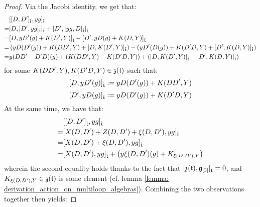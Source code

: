 \begin{proof}
                Via the Jacobi identity, we get that:
                    $$
                        \begin{aligned}
                            & [ [D, D']_{\hat{\mathfrak{t}}}, y g ]_{\hat{\mathfrak{t}}}
                            \\
                            = & [ D, [ D', y g ]_{\hat{\mathfrak{t}}} ]_{\hat{\mathfrak{t}}} + [ D', [ y g, D ]_{\hat{\mathfrak{t}}} ]_{\hat{\mathfrak{t}}}
                            \\
                            = & [ D, y D'( g ) + K(D', Y) ]_{\hat{\mathfrak{t}}} - [ D', y D( g ) + K(D, Y) ]_{\hat{\mathfrak{t}}}
                            \\
                            = & \left( y D( D'(g) ) + K(DD', Y) + [ D, K(D', Y) ]_{\hat{\mathfrak{t}}} \right) - \left( y D'( D(g) ) + K(D'D, Y) + [ D', K(D, Y) ]_{\hat{\mathfrak{t}}} \right)
                            \\
                            = & y (DD' - D'D)( g ) + ( K(DD', Y) - K(D'D, Y) ) + ( [ D, K(D', Y) ]_{\hat{\mathfrak{t}}} - [ D', K(D, Y) ]_{\hat{\mathfrak{t}}} )
                        \end{aligned}
                    $$
                for some $K(DD', Y), K(D'D, Y) \in \mathfrak{z}(\mathfrak{t})$ such that:
                    $$[ D, y D'( g ) ]_{\hat{\mathfrak{t}}} := y D( D'( g ) ) + K(DD', Y)$$
                    $$[ D', y D( g ) ]_{\hat{\mathfrak{t}}} := y D( D'( g ) ) + K(D'D, Y)$$
                At the same time, we have that:
                    $$
                        \begin{aligned}
                            & [ [D, D']_{\hat{\mathfrak{t}}}, y g ]_{\hat{\mathfrak{t}}}
                            \\
                            = & [ X(D, D') + Z(D, D') + \xi(D, D') , y g ]_{\hat{\mathfrak{t}}}
                            \\
                            = & [ X(D, D') + \xi(D, D') , y g ]_{\hat{\mathfrak{t}}}
                            \\
                            = & [ X(D, D') , y g ]_{\hat{\mathfrak{t}}} + \left( y \xi(D, D')(g) + K_{\xi(D, D'), Y} \right)
                        \end{aligned}
                    $$
                wherein the second equality holds thanks to the fact that $[\mathfrak{z}(\mathfrak{t}), \mathfrak{g}_{[2]}]_{\hat{\mathfrak{t}}} = 0$, and $K_{\xi(D, D'), Y} \in \mathfrak{z}(\mathfrak{t})$ is some element (cf. lemma \ref{lemma: derivation_action_on_multiloop_algebras}). Combining the two observations together then yields:

\end{proof}

